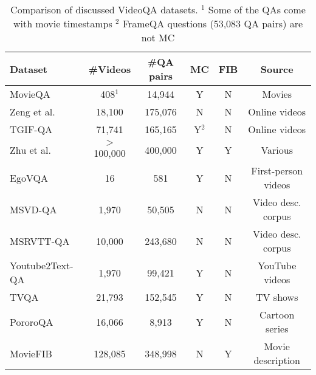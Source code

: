 \documentclass[../interim.tex]{subfiles}
\begin{document}
\begin{center}
\begin{table}
\begin{tabular}{ |l|c c c c c| }
  \hline
  \textbf{Dataset} & \textbf{\#Videos} & \textbf{\#QA pairs} & \textbf{MC} & \textbf{FIB} & \textbf{Source} \\
  \hline
  \hline
  MovieQA         & 408$^1$        & 14,944  & Y  & N & Movies \\
  Zeng et al.     & 18,100     & 175,076 & N  & N & Online videos \\
  TGIF-QA         & 71,741     & 165,165 & Y$^2$  & N & Online videos \\
  Zhu  et al.     & $>$100,000 & 400,000 & Y  & Y & Various \\
  EgoVQA          & 16         & 581     & Y  & N & First-person videos \\
  MSVD-QA         & 1,970      & 50,505  & N  & N & Video desc. corpus \\
  MSRVTT-QA       & 10,000     & 243,680 & N  & N & Video desc. corpus \\
  Youtube2Text-QA & 1,970      & 99,421  & Y  & N & YouTube videos \\
  TVQA            & 21,793     & 152,545 & Y  & N & TV shows \\
  PororoQA        & 16,066     & 8,913   & Y  & N & Cartoon series \\
  MovieFIB        & 128,085    & 348,998 & N  & Y & Movie description \\
  \hline
\end{tabular}
\caption{Comparison of discussed VideoQA datasets. \newline $^1$ Some of the QAs come with movie timestamps \newline $^2$ FrameQA questions (53,083 QA pairs) are not MC}
\label{table:datasets}
\end{table}
\end{center}

\end{document}
